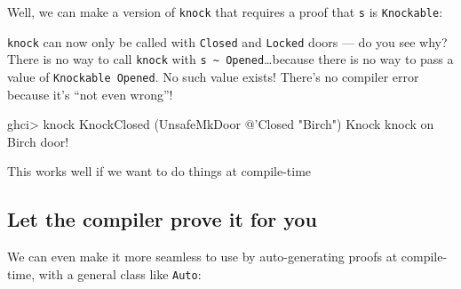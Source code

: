 \documentclass[]{article}
\newenvironment{Shaded}{}{}
\newcommand{\CommentTok}[1]{\textcolor[rgb]{0.38,0.63,0.69}{\textit{#1}}}
\newcommand{\DataTypeTok}[1]{\textcolor[rgb]{0.56,0.13,0.00}{#1}}
\newcommand{\FunctionTok}[1]{\textcolor[rgb]{0.02,0.16,0.49}{#1}}
\newcommand{\NormalTok}[1]{#1}
\newcommand{\OtherTok}[1]{\textcolor[rgb]{0.00,0.44,0.13}{#1}}
\newcommand{\StringTok}[1]{\textcolor[rgb]{0.25,0.44,0.63}{#1}}
\begin{document}
Well, we can make a version of \texttt{knock} that requires a proof that
\texttt{s} is \texttt{Knockable}:

\begin{Shaded}
\end{Shaded}

\texttt{knock} can now only be called with \texttt{Closed} and \texttt{Locked}
doors --- do you see why? There is no way to call \texttt{knock} with
\texttt{s\ \textasciitilde{}\ \textquotesingle{}Opened}\ldots{}because there is
no way to pass a value of \texttt{Knockable\ \textquotesingle{}Opened}. No such
value exists! There's no compiler error because it's ``not even wrong''!

\begin{Shaded}
\begin{Highlighting}[]
\NormalTok{ghci}\FunctionTok{>}\NormalTok{ knock }\DataTypeTok{KnockClosed}\NormalTok{ (}\DataTypeTok{UnsafeMkDoor} \FunctionTok{@}\NormalTok{'}\DataTypeTok{Closed} \StringTok{"Birch"}\NormalTok{)}
\DataTypeTok{Knock}\NormalTok{ knock on }\DataTypeTok{Birch}\NormalTok{ door}\FunctionTok{!}
\end{Highlighting}
\end{Shaded}

This works well if we want to do things at compile-time

\hypertarget{let-the-compiler-prove-it-for-you}{%
\subsection{Let the compiler prove it for
you}\label{let-the-compiler-prove-it-for-you}}

We can even make it more seamless to use by auto-generating proofs at
compile-time, with a general class like \texttt{Auto}:
\end{document}
